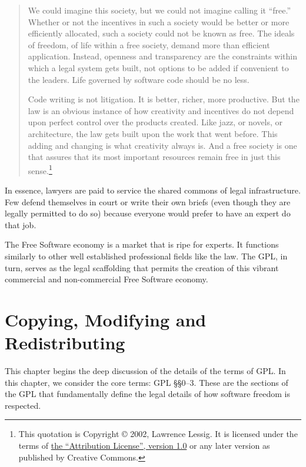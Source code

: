 \documentclass[12pt]{report}
\begin{document}
\begin{quotation}
We could imagine this society, but we could not imagine calling it
``free.''  Whether or not the incentives in such a society would be better
or more efficiently allocated, such a society could not be known as free.
The ideals of freedom, of life within a free society, demand more than
efficient application.  Instead, openness and transparency are the
constraints within which a legal system gets built, not options to be
added if convenient to the leaders.  Life governed by software code should
be no less.

Code writing is not litigation.  It is better, richer, more
productive. But the law is an obvious instance of how creativity and
incentives do not depend upon perfect control over the products created.
Like jazz, or novels, or architecture, the law gets built upon the work
that went before. This adding and changing is what creativity always is.
And a free society is one that assures that its most important resources
remain free in just this sense.\footnote{This quotation is Copyright
  \copyright{} 2002, Lawrence Lessig.  It is licensed under the terms of
  \href{http://creativecommons.org/licenses/by/1.0/}{the ``Attribution
    License'', version 1.0} or any later version as published by Creative
  Commons.}
\end{quotation}

In essence, lawyers are paid to service the shared commons of legal
infrastructure.  Few defend themselves in court or write their own briefs
(even though they are legally permitted to do so) because everyone would
prefer to have an expert do that job.

The Free Software economy is a market that is ripe for experts.  It
functions similarly to other well established professional fields like the
law.  The GPL, in turn, serves as the legal scaffolding that permits the
creation of this vibrant commercial and non-commercial Free Software
economy.

\chapter{Copying, Modifying and Redistributing}

This chapter begins the deep discussion of the details of the terms of
GPL\@.  In this chapter, we consider the core terms: GPL \S\S 0--3.  These
are the sections of the GPL that fundamentally define the legal details of
how software freedom is respected.
\end{document}
